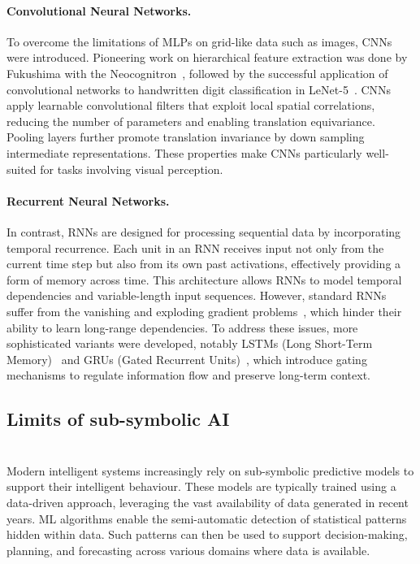 \paragraph{Convolutional Neural Networks.}
%
To overcome the limitations of \glspl{MLP} on grid-like data such as images, \glspl{CNN} were introduced.
%
Pioneering work on hierarchical feature extraction was done by Fukushima with the Neocognitron~\cite{fukushima1980neocognitron}, followed by the successful application of convolutional networks to handwritten digit classification in LeNet-5~\cite{lecun1998gradient}.
%
\glspl{CNN} apply learnable convolutional filters that exploit local spatial correlations, reducing the number of parameters and enabling translation equivariance.
%
Pooling layers further promote translation invariance by down sampling intermediate representations.
%
These properties make \glspl{CNN} particularly well-suited for tasks involving visual perception.

\paragraph{Recurrent Neural Networks.}
%
In contrast, \glspl{RNN} are designed for processing sequential data by incorporating temporal recurrence.
%
Each unit in an \gls{RNN} receives input not only from the current time step but also from its own past activations, effectively providing a form of memory across time.
%
This architecture allows \glspl{RNN} to model temporal dependencies and variable-length input sequences.
%
However, standard \glspl{RNN} suffer from the vanishing and exploding gradient problems~\cite{bengio1994learning}, which hinder their ability to learn long-range dependencies.
%
To address these issues, more sophisticated variants were developed, notably \glspl{LSTM} (Long Short-Term Memory)~\cite{hochreiter1997long} and \glspl{GRU} (Gated Recurrent Units)~\cite{cho2014learning}, which introduce gating mechanisms to regulate information flow and preserve long-term context.


\subsection[Limits of sub-symbolic AI]{Limits of sub-symbolic \Gls{AI}}\label{subsubsec:limits-of-sub-symbolic-ai}



\section[Explainable AI]{}\label{subsec:xai}
%
Modern intelligent systems increasingly rely on sub-symbolic predictive models to support their intelligent behaviour.
%
These models are typically trained using a data-driven approach, leveraging the vast availability of data generated in recent years.
%
\Gls{ML} algorithms enable the semi-automatic detection of statistical patterns hidden within data.
%
Such patterns can then be used to support decision-making, planning, and forecasting across various domains where data is available.


